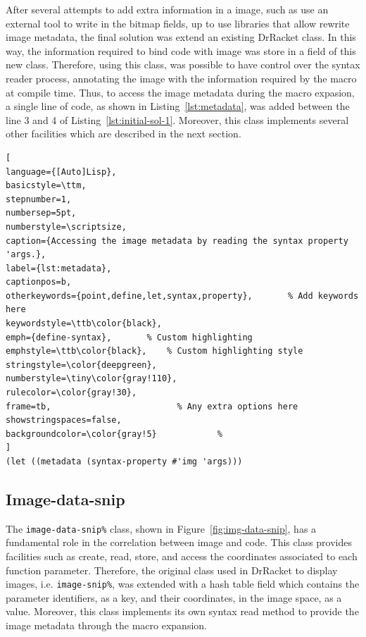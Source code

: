 After several attempts to add extra information in a image, such as use an external tool to write in the bitmap fields, up to use libraries that allow rewrite image metadata, the final solution was extend an existing DrRacket class. In this way, the information required to bind code with image was store in a field of this new class. Therefore, using this class, was possible to have control over the syntax reader process, annotating the image with the information required by the macro at compile time. Thus, to access the image metadata during the macro expasion, a single line of code, as shown in Listing~\ref{lst:metadata}, was added between the line 3 and 4 of Listing~\ref{lst:initial-sol-1}. Moreover, this class implements several other facilities which are described in the next section. \\

\begin{lstlisting}[
language={[Auto]Lisp},
basicstyle=\ttm,
stepnumber=1,
numbersep=5pt,                   
numberstyle=\scriptsize, 
caption={Accessing the image metadata by reading the syntax property 'args.},
label={lst:metadata},
captionpos=b, 
otherkeywords={point,define,let,syntax,property},       % Add keywords here
keywordstyle=\ttb\color{black},
emph={define-syntax},       % Custom highlighting
emphstyle=\ttb\color{black},    % Custom highlighting style
stringstyle=\color{deepgreen},
numberstyle=\tiny\color{gray!110},
rulecolor=\color{gray!30},
frame=tb,                         % Any extra options here
showstringspaces=false,
backgroundcolor=\color{gray!5}            % 
]
(let ((metadata (syntax-property #'img 'args)))
\end{lstlisting}

\subsection{Image-data-snip}

The \texttt{image-data-snip\%} class, shown in Figure~\ref{fig:img-data-snip}, has a fundamental role in the correlation between image and code. This class provides facilities such as create, read, store, and access the coordinates associated to each function parameter. Therefore, the original class used in DrRacket to display images, i.e. \texttt{image-snip\%}, was extended with a hash table field which contains the parameter identifiers, as a key, and their coordinates, in the image space, as a value. Moreover, this class implements its own syntax read method to provide the image metadata through the macro expansion.

